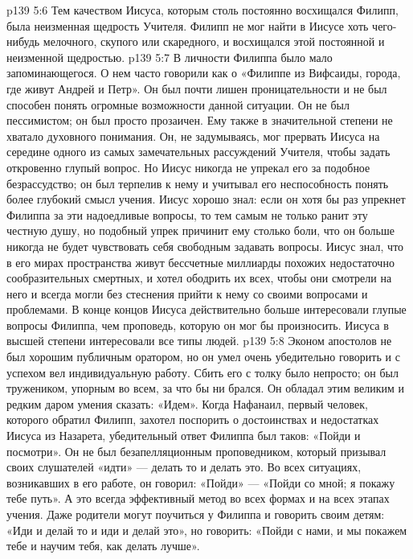 \vs p139 5:6 Тем качеством Иисуса, которым столь постоянно восхищался Филипп, была неизменная щедрость Учителя. Филипп не мог найти в Иисусе хоть чего\hyp{}нибудь мелочного, скупого или скаредного, и восхищался этой постоянной и неизменной щедростью.
\vs p139 5:7 \pc В личности Филиппа было мало запоминающегося. О нем часто говорили как о «Филиппе из Вифсаиды, города, где живут Андрей и Петр». Он был почти лишен проницательности и не был способен понять огромные возможности данной ситуации. Он не был пессимистом; он был просто прозаичен. Ему также в значительной степени не хватало духовного понимания. Он, не задумываясь, мог прервать Иисуса на середине одного из самых замечательных рассуждений Учителя, чтобы задать откровенно глупый вопрос. Но Иисус никогда не упрекал его за подобное безрассудство; он был терпелив к нему и учитывал его неспособность понять более глубокий смысл учения. Иисус хорошо знал: если он хотя бы раз упрекнет Филиппа за эти надоедливые вопросы, то тем самым не только ранит эту честную душу, но подобный упрек причинит ему столько боли, что он больше никогда не будет чувствовать себя свободным задавать вопросы. Иисус знал, что в его мирах пространства живут бессчетные миллиарды похожих недостаточно сообразительных смертных, и хотел ободрить их всех, чтобы они смотрели на него и всегда могли без стеснения прийти к нему со своими вопросами и проблемами. В конце концов Иисуса действительно больше интересовали глупые вопросы Филиппа, чем проповедь, которую он мог бы произносить. Иисуса в высшей степени интересовали  все типы людей.
\vs p139 5:8 Эконом апостолов не был хорошим публичным оратором, но он умел очень убедительно говорить и с успехом вел индивидуальную работу. Сбить его с толку было непросто; он был тружеником, упорным во всем, за что бы ни брался. Он обладал этим великим и редким даром умения сказать: «Идем». Когда Нафанаил, первый человек, которого обратил Филипп, захотел поспорить о достоинствах и недостатках Иисуса из Назарета, убедительный ответ Филиппа был таков: «Пойди и посмотри». Он не был безапелляционным проповедником, который призывал своих слушателей «идти» --- делать то и делать это. Во всех ситуациях, возникавших в его работе, он говорил: «Пойди» --- «Пойди со мной; я покажу тебе путь». А это всегда эффективный метод во всех формах и на всех этапах учения. Даже родители могут поучиться у Филиппа и  говорить своим детям: «Иди и делай то и иди и делай это», но говорить: «Пойди с нами, и мы покажем тебе и научим тебя, как делать лучше».
